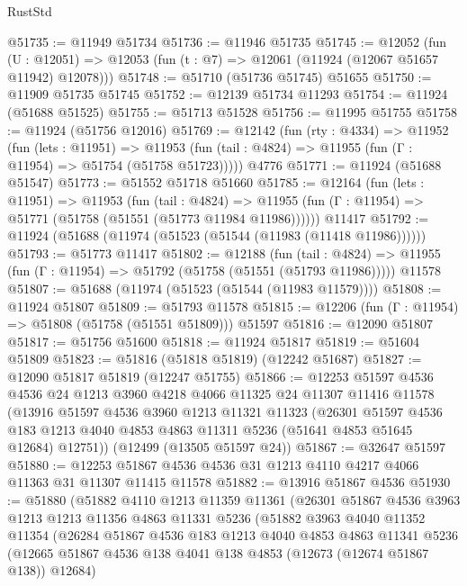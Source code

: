 \begin{lexlean}{RustStd}
\begin{coremodule}
{\begin{coremodule}
{{{{{{{{{{{{{{{{{{{{{{{{{{{{{{{{{{{{{{{{{{{{{{{{{{{{{{{{{{{{{{{{{{{{{{{{{{{{{{{{@51735 := @11949 @51734
@51736 := @11946 @51735
@51745 := @12052
    (fun (U : @12051) => @12053 (fun (t : @7) => @12061 (@11924 (@12067 @51657 @11942) @12078)))
@51748 := @51710 (@51736 @51745) @51655
@51750 := @11909 @51735 @51745
@51752 := @12139 @51734 @11293
@51754 := @11924 (@51688 @51525)
@51755 := @51713 @51528
@51756 := @11995 @51755
@51758 := @11924 (@51756 @12016)
@51769 := @12142
    (fun (rty : @4334) =>
    @11952
      (fun (lets : @11951) =>
      @11953 (fun (tail : @4824) => @11955 (fun (Γ : @11954) => @51754 (@51758 @51723)))))
    @4776
@51771 := @11924 (@51688 @51547)
@51773 := @51552 @51718 @51660
@51785 := @12164
    (fun (lets : @11951) =>
    @11953
      (fun (tail : @4824) =>
      @11955 (fun (Γ : @11954) => @51771 (@51758 (@51551 (@51773 @11984 @11986))))))
    @11417
@51792 := @11924 (@51688 (@11974 (@51523 (@51544 (@11983 (@11418 @11986))))))
@51793 := @51773 @11417
@51802 := @12188
    (fun (tail : @4824) => @11955 (fun (Γ : @11954) => @51792 (@51758 (@51551 (@51793 @11986)))))
    @11578
@51807 := @51688 (@11974 (@51523 (@51544 (@11983 @11579))))
@51808 := @11924 @51807
@51809 := @51793 @11578
@51815 := @12206 (fun (Γ : @11954) => @51808 (@51758 (@51551 @51809))) @51597
@51816 := @12090 @51807
@51817 := @51756 @51600
@51818 := @11924 @51817
@51819 := @51604 @51809
@51823 := @51816 (@51818 @51819) (@12242 @51687)
@51827 := @12090 @51817 @51819 (@12247 @51755)
@51866 := @12253
    @51597
    @4536
    @4536
    @24
    @1213
    @3960
    @4218
    @4066
    @11325
    @24
    @11307
    @11416
    @11578
    (@13916
      @51597
      @4536
      @3960
      @1213
      @11321
      @11323
      (@26301
        @51597
        @4536
        @183
        @1213
        @4040
        @4853
        @4863
        @11311
        @5236
        (@51641 @4853 @51645 @12684)
        @12751))
    (@12499 (@13505 @51597 @24))
@51867 := @32647 @51597
@51880 := @12253 @51867 @4536 @4536 @31 @1213 @4110 @4217 @4066 @11363 @31 @11307 @11415 @11578
@51882 := @13916 @51867 @4536
@51930 := @51880
    (@51882
      @4110
      @1213
      @11359
      @11361
      (@26301
        @51867
        @4536
        @3963
        @1213
        @1213
        @11356
        @4863
        @11331
        @5236
        (@51882
          @3963
          @4040
          @11352
          @11354
          (@26284
            @51867
            @4536
            @183
            @1213
            @4040
            @4853
            @4863
            @11341
            @5236
            (@12665 @51867 @4536 @138 @4041 @138 @4853 (@12673 (@12674 @51867 @138)) @12684)
}}}}}}}}}}}}}}}}}}}}}}}}}}}}}}}}}}}}}}}}}}}}}}}}}}}}}}}}}}}}}}}}}}}}}}}}}}}}}}}}
\end{coremodule}}
\end{coremodule}
\end{lexlean}
